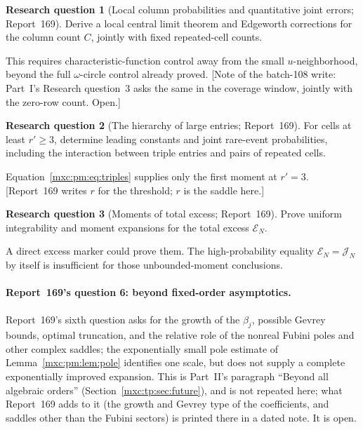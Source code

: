 \documentclass[11pt]{article}
\numberwithin{equation}{section}
\theoremstyle{definition}
\newtheorem{question}{Research question}
\theoremstyle{remark}
\begin{document}
\begin{question}[Local column probabilities and quantitative joint errors; Report~169]\label{mxc:pm:q:local}
Derive a local central limit theorem and Edgeworth corrections for the column
count $C$, jointly with fixed repeated-cell counts.
\end{question}
This requires characteristic-function control away from the small
$u$-neighborhood, beyond the full $\omega$-circle control already proved.
[Note of the batch-108 write: Part~I's Research question~3 asks the same in
the coverage window, jointly with the zero-row count. Open.]

\begin{question}[The hierarchy of large entries; Report~169]\label{mxc:pm:q:hierarchy}
For cells at least $r'\ge3$, determine leading constants and joint rare-event
probabilities, including the interaction between triple entries and pairs of
repeated cells.
\end{question}
Equation~\eqref{mxc:pm:eq:triples} supplies only the first moment at $r'=3$.
[Report~169 writes $r$ for the threshold; $r$ is the saddle here.]

\begin{question}[Moments of total excess; Report~169]\label{mxc:pm:q:excess}
Prove uniform integrability and moment expansions for the total excess
$\mathcal E_N$.
\end{question}
A direct excess marker could prove them. The high-probability equality
$\mathcal E_N=\mathcal J_N$ by itself is insufficient for those unbounded-moment
conclusions.

\paragraph{Report~169's question 6: beyond fixed-order asymptotics.}
Report~169's sixth question asks for the growth of the $\beta_j$, possible
Gevrey bounds, optimal truncation, and the relative role of the nonreal
Fubini poles and other complex saddles; the exponentially small pole estimate
of Lemma~\ref{mxc:pm:lem:pole} identifies one scale, but does not supply a
complete exponentially improved expansion. This is Part~II's paragraph
``Beyond all algebraic orders'' (Section~\ref{mxc:tp:sec:future}), and is not
repeated here; what Report~169 adds to it (the growth and Gevrey type of the
coefficients, and saddles other than the Fubini sectors) is printed there in a
dated note. It is open.

\appendix
\end{document}
